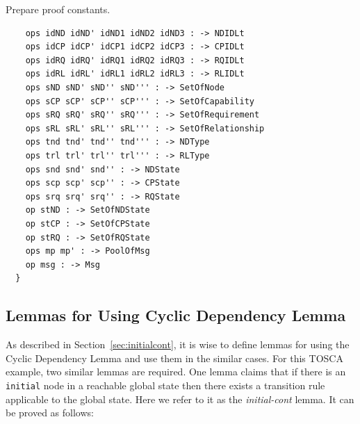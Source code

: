 \documentclass[12pt]{report}
\begin{document}
 Prepare proof constants.
\small
\begin{verbatim}
    ops idND idND' idND1 idND2 idND3 : -> NDIDLt
    ops idCP idCP' idCP1 idCP2 idCP3 : -> CPIDLt
    ops idRQ idRQ' idRQ1 idRQ2 idRQ3 : -> RQIDLt
    ops idRL idRL' idRL1 idRL2 idRL3 : -> RLIDLt
    ops sND sND' sND'' sND''' : -> SetOfNode
    ops sCP sCP' sCP'' sCP''' : -> SetOfCapability
    ops sRQ sRQ' sRQ'' sRQ''' : -> SetOfRequirement
    ops sRL sRL' sRL'' sRL''' : -> SetOfRelationship
    ops tnd tnd' tnd'' tnd''' : -> NDType
    ops trl trl' trl'' trl''' : -> RLType
    ops snd snd' snd'' : -> NDState
    ops scp scp' scp'' : -> CPState
    ops srq srq' srq'' : -> RQState
    op stND : -> SetOfNDState
    op stCP : -> SetOfCPState
    op stRQ : -> SetOfRQState
    ops mp mp' : -> PoolOfMsg
    op msg : -> Msg
  }
\end{verbatim}
\normalsize

\subsection{Lemmas for Using Cyclic Dependency Lemma}
\label{sec:TOSCAcont}
As described in Section~\ref{sec:initialcont}, it is wise to define
lemmas for using the Cyclic Dependency Lemma and use them in the
similar cases. For this TOSCA example, two similar lemmas are
required. One lemma claims that if there is an {\tt initial} node in a
reachable global state then there exists a transition rule applicable to the
global state. Here we refer to it as the {\it initial-cont} lemma. It
can be proved as follows:\\
\end{document}
